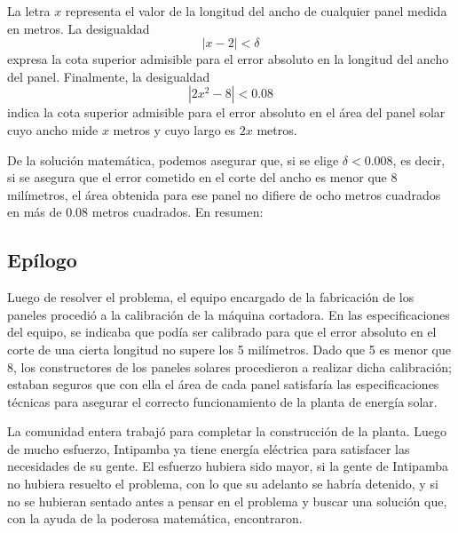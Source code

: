 La letra $x$ representa el valor de la longitud del ancho de cualquier panel medida en metros. La
desigualdad
\[
|x - 2| < \delta
\]
expresa la cota superior admisible para el error absoluto en la longitud del ancho del panel.
Finalmente, la desigualdad
\[
|2x^2 - 8| < 0.08
\]
indica la cota superior admisible para el error absoluto en el área del panel solar cuyo ancho mide
$x$ metros y cuyo largo es $2x$ metros.

De la solución matemática, podemos asegurar que, si se elige $\delta < 0.008$, es decir, si se
asegura que el error cometido en el corte del ancho es menor que 8 milímetros, el área obtenida
para ese panel no difiere de ocho metros cuadrados en más de 0.08 metros cuadrados. En resumen:

\subsection{Epílogo}
Luego de resolver el problema, el equipo encargado de la fabricación de los paneles procedió a la
calibración de la máquina cortadora. En las especificaciones del equipo, se indicaba que podía ser
calibrado para que el error absoluto en el corte de una cierta longitud no supere los 5 milímetros.
Dado que 5 es menor que 8, los constructores de los paneles solares procedieron a realizar dicha
calibración; estaban seguros que con ella el área de cada panel satisfaría las especificaciones
técnicas para asegurar el correcto funcionamiento de la planta de energía solar.

La comunidad entera trabajó para completar la construcción de la planta. Luego de mucho esfuerzo,
Intipamba ya tiene energía eléctrica para satisfacer las necesidades de su gente. El esfuerzo
hubiera sido mayor, si la gente de Intipamba no hubiera resuelto el problema, con lo que su
adelanto se habría detenido, y si no se hubieran sentado antes a pensar en el problema y buscar una
solución que, con la ayuda de la poderosa matemática, encontraron.

